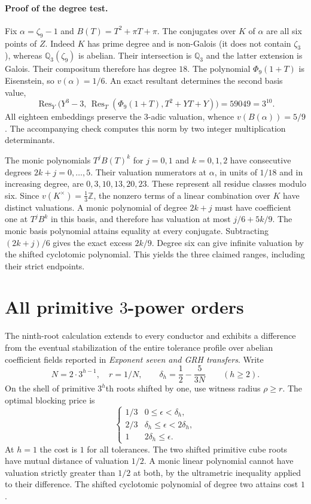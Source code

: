 \documentclass[11pt]{article}
\begin{document}
\paragraph{Proof of the degree test.} Fix $\alpha=\zeta_9-1$ and
$B(T)=T^2+\pi T+\pi$. The conjugates over $K$ of $\alpha$ are all six
points of $Z$. Indeed $K$ has prime degree and is non-Galois
(it does not contain $\zeta_3$), whereas $\mathbb Q_3(\zeta_9)$ is
abelian. Their intersection is $\mathbb Q_3$ and the latter extension
is Galois. Their compositum therefore has degree $18$.
The polynomial $\Phi_9(1+T)$ is Eisenstein, so $v(\alpha)=1/6$.
An exact resultant determines the second basis value,
\[
 \operatorname{Res}_{Y}\bigl(Y^3-3,\,
 \operatorname{Res}_{T}(\Phi_9(1+T),T^2+YT+Y)\bigr)=59049=3^{10}.
\]
All eighteen embeddings preserve the $3$-adic valuation, whence
$v(B(\alpha))=5/9$. The accompanying check computes this norm by two
integer multiplication determinants.

The monic polynomials $T^jB(T)^k$ for $j=0,1$ and $k=0,1,2$ have
consecutive degrees $2k+j=0,\ldots,5$. Their valuation numerators at
$\alpha$, in units of $1/18$ and in increasing degree, are
$0,3,10,13,20,23$. These represent all residue classes modulo six.
Since $v(K^\times)=\frac13\mathbb Z$, the nonzero terms of a linear
combination over $K$ have distinct valuations. A monic polynomial of
degree $2k+j$ must have coefficient one at $T^jB^k$ in this basis,
and therefore has valuation at most $j/6+5k/9$. The monic basis
polynomial attains equality at every conjugate. Subtracting
$(2k+j)/6$ gives the exact excess $2k/9$. Degree six can give infinite
valuation by the shifted cyclotomic polynomial. This yields the three
claimed ranges, including their strict endpoints.
\section*{All primitive $3$-power orders}
The ninth-root calculation extends to every conductor and exhibits a
difference from the eventual stabilization of the entire tolerance
profile over abelian coefficient fields reported in \emph{Exponent seven
and GRH transfers}. Write
\[
 N=2\cdot3^{h-1},\quad r=1/N,\qquad
 \delta_h=\frac12-\frac{5}{3N}\qquad(h\ge2).
\]
On the shell of primitive $3^h$th roots shifted by one, use witness
radius $\rho\ge r$. The optimal blocking price is
\[
 \begin{cases}
 1/3 & 0\le\epsilon<\delta_h,\\
 2/3 & \delta_h\le\epsilon<2\delta_h,\\
 1   & 2\delta_h\le\epsilon .
 \end{cases}                                                     \tag{1}
\]
At $h=1$ the cost is $1$ for all tolerances. The two shifted primitive
cube roots have mutual distance of valuation $1/2$. A monic linear
polynomial cannot have valuation strictly greater than $1/2$ at both,
by the ultrametric inequality applied to their difference. The shifted
cyclotomic polynomial of degree two attains cost $1$.
\end{document}

